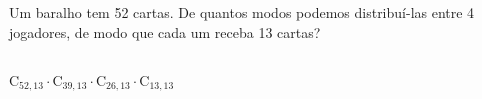 \begin{ex}
 Um baralho tem 52 cartas. De quantos modos podemos distribuí-las entre 4 jogadores, de modo que cada um receba 13 cartas?
   \begin{sol}
       \phantom{A} \\
    $\mathrm{C}_{{52},{13}}\cdot \mathrm{C}_{{39},{13}}\cdot \mathrm{C}_{{26},{13}}\cdot \mathrm{C}_{{13},{13}}$
   \end{sol}
\end{ex}